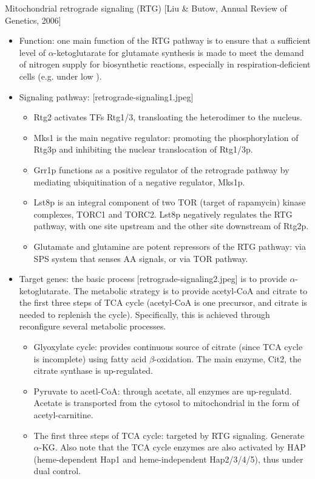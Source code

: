 \documentclass{report}
\begin{document}
Mitochondrial retrograde signaling (RTG) [Liu \& Butow, Annual Review of Genetics, 2006]
\begin{itemize}
	\item Function: one main function of the RTG pathway is to ensure that a sufficient level of $\alpha$-ketoglutarate for glutamate synthesis is made to meet the demand of nitrogen supply for biosynthetic reactions, especially in respiration-deficient cells (e.g. under low ). 
	
	\item Signaling pathway: [retrograde-signaling1.jpeg]
	\begin{itemize}
		\item Rtg2 activates TFs Rtg1/3, transloating the heterodimer to the nucleus. 
		\item Mks1 is the main negative regulator: promoting the phosphorylation of Rtg3p and inhibiting the nuclear translocation of Rtg1/3p.
		\item Grr1p functions as a positive regulator of the retrograde pathway by mediating ubiquitination of a negative regulator, Mks1p. 
		\item Lst8p is an integral component of two TOR (target of rapamycin) kinase complexes, TORC1 and TORC2. Lst8p negatively regulates the RTG pathway, with one site upstream and the other site downstream of Rtg2p. 
		\item Glutamate and glutamine are potent repressors of the RTG pathway: via SPS system that senses AA signals, or via TOR pathway. 
	\end{itemize}
	
	\item Target genes: the basic process [retrograde-signaling2.jpeg] is to provide $\alpha$-ketoglutarate. The metabolic strategy is to provide acetyl-CoA and citrate to the first three steps of TCA cycle (acetyl-CoA is one precursor, and citrate is needed to replenish the cycle). Specifically, this is achieved through reconfigure several metabolic processes. 
	\begin{itemize}
		\item Glyoxylate cycle: provides continuous source of citrate (since TCA cycle is incomplete) using fatty acid $\beta$-oxidation. The main enzyme, Cit2, the citrate synthase is up-regulated. 
		\item Pyruvate to acetl-CoA: through acetate, all enzymes are up-regulatd. Acetate is transported from the cytosol to mitochondrial in the form of acetyl-carnitine. 
		\item The first three steps of TCA cycle: targeted by RTG signaling. Generate $\alpha$-KG. Also note that the TCA cycle enzymes are also activated by HAP (heme-dependent Hap1 and heme-independent Hap2/3/4/5), thus under dual control. 
	\end{itemize}
\end{itemize}
\end{document}

